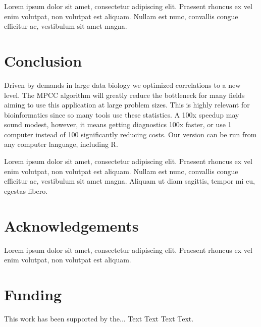 \documentclass{bioinfo}
\begin{document}
Lorem ipsum dolor sit amet, consectetur adipiscing elit. Praesent 
rhoncus ex vel enim volutpat, non volutpat est aliquam. Nullam est 
nunc, convallis congue efficitur ac, vestibulum sit amet magna.

\section{Conclusion}

Driven by demands in large data biology we optimized correlations to a new level. 
The MPCC algorithm will greatly reduce the bottleneck for many fields aiming to 
use this application at large problem sizes. This is highly relevant for 
bioinformatics since so many tools use these statistics. A 100x speedup may sound
modest, however, it means getting diagnostics 100x faster, or use 1 computer 
instead of 100 significantly reducing costs. Our version can be run from any 
computer language, including R.

Lorem ipsum dolor sit amet, consectetur adipiscing elit. Praesent 
rhoncus ex vel enim volutpat, non volutpat est aliquam. Nullam est 
nunc, convallis congue efficitur ac, vestibulum sit amet magna. 
Aliquam ut diam sagittis, tempor mi eu, egestas libero.

\section*{Acknowledgements}

Lorem ipsum dolor sit amet, consectetur adipiscing elit. Praesent 
rhoncus ex vel enim volutpat, non volutpat est aliquam.
\vspace*{-12pt}

\section*{Funding}

This work has been supported by the... Text Text  Text Text.\vspace*{-12pt}


%
%
%
%

%

\end{document}
